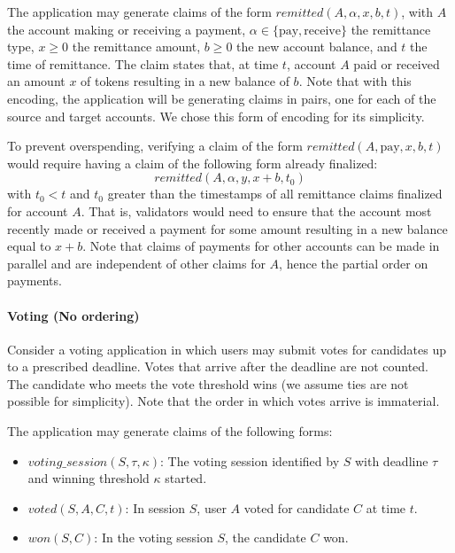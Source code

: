 \documentclass{article}
\begin{document}
The application may generate claims of the form $\textit{remitted}(A, \alpha, x, b, t)$, with $A$ the account making or receiving a payment, $\alpha \in \{ \text{pay}, \text{receive}\}$ the remittance type, $x \geq 0$ the remittance amount, $b \geq 0$ the new account balance, and $t$ the time of remittance. The claim states that, at time $t$, account $A$ paid or received an amount $x$ of tokens resulting in a new balance of $b$. Note that with this encoding, the application will be generating claims in pairs, one for each of the source and target accounts. We chose this form of encoding for its simplicity.

To prevent overspending, verifying a claim of the form $\textit{remitted}(A, \text{pay}, x, b, t)$ would require having a claim of the following form already finalized: 
$$\textit{remitted}(A, \alpha, y, x + b, t_0)$$
with $t_0 < t$ and $t_0$ greater than the timestamps of all remittance claims finalized for account $A$. That is, validators would need to ensure that the account most recently made or received a payment for some amount resulting in a new balance equal to $x + b$. Note that claims of payments for other accounts can be made in parallel and are independent of other claims for $A$, hence the partial order on payments.

\paragraph{Voting (No ordering)\\}
Consider a voting application in which users may submit votes for candidates up to a prescribed deadline. Votes that arrive after the deadline are not counted. The candidate who meets the vote threshold wins (we assume ties are not possible for simplicity). Note that the order in which votes arrive is immaterial.

The application may generate claims of the following forms:
\begin{itemize}
    \item $\textit{voting\_session}(S, \tau, \kappa)$: The voting session identified by $S$ with deadline $\tau$ and winning threshold $\kappa$ started.
    \item $\textit{voted}(S, A, C, t)$: In session $S$, user $A$ voted for candidate $C$ at time $t$.
    \item $won(S, C)$: In the voting session $S$, the candidate $C$ won.
\end{itemize}
\end{document}
